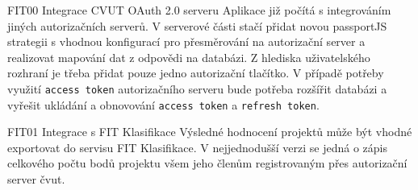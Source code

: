 \begin{dl}


   \item[FIT00 Integrace CVUT OAuth 2.0 serveru]
   Aplikace již počítá s integrováním jiných autorizačních serverů. V serverové části stačí přidat novou passportJS strategii s vhodnou konfigurací pro přesměrování na autorizační server a realizovat mapování dat z odpovědi na databázi. Z hlediska uživatelského rozhraní je třeba přidat pouze jedno autorizační tlačítko. V případě potřeby využití \texttt{access token} autorizačního serveru bude potřeba rozšířit databázi a vyřešit ukládání a obnovování \texttt{access token} a \texttt{refresh token}.

   \item[FIT01 Integrace s FIT Klasifikace]
   Výsledné hodnocení projektů může být vhodné exportovat do servisu FIT Klasifikace. V nejjednodušší verzi se jedná o zápis celkového počtu bodů projektu všem jeho členům registrovaným přes autorizační server \gls{čvut}. 

\end{dl}
